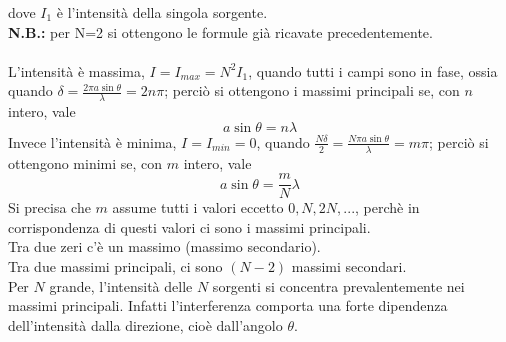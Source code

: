 \documentclass{article}
\begin{document}
dove $I_1$ è l’intensità della singola sorgente.\\
\textbf{N.B.:} per N=2 si ottengono le formule già ricavate precedentemente.\\
\\
L’intensità è massima, $I=I_{max}=N^2I_1$, quando tutti i campi sono in fase, ossia quando $\delta=\frac{2\pi a\sin\theta}{\lambda}=2n\pi$; perciò si ottengono i massimi principali se, con $n$ intero, vale
\begin{equation}
    a\sin\theta=n\lambda 
    \nonumber
\end{equation}
Invece l'intensità è minima, $I=I_{min}=0$, quando $\frac{N\delta}{2}=\frac{N\pi a\sin\theta}{\lambda}=m\pi$; perciò si ottengono minimi se, con $m$ intero, vale
\begin{equation}
    a\sin\theta=\frac{m}{N}\lambda 
    \nonumber
\end{equation}
Si precisa che $m$ assume tutti i valori eccetto $0, N, 2N, ...$, perchè in corrispondenza di questi valori ci sono i massimi principali. \\
Tra due zeri c’è un massimo (massimo secondario).\\
Tra due massimi principali, ci sono $(N-2)$ massimi secondari.\\
Per $N$ grande, l’intensità delle $N$ sorgenti si concentra prevalentemente nei massimi principali. Infatti l’interferenza comporta una forte dipendenza dell’intensità dalla direzione, cioè dall’angolo $\theta$.
\end{document}
